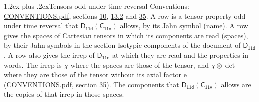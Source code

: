 \documentclass[10pt,a4paper]{article}
\makeatletter
\renewcommand\section{\@startsection{section}{1}{\z@}{-3ex plus -1ex minus -.2ex}%
  {1.2ex plus .2ex}{\normalfont\large\sffamily\bfseries\color{parttitle}}}
\numberwithin{equation}{section}
\newcommand{\grp}[1]{\mathsf{#1}}
\newcommand{\irrprod}{\otimes}
\makeatother
\begin{document}
\section{Tensors odd under time reversal}\label{s:time_odd}
Conventions: \href{../../CONVENTIONS.pdf}{CONVENTIONS.pdf}, sections \href{../../../rotation/CONVENTIONS.pdf\#conv.10}{10}, \href{../../../rotation/CONVENTIONS.pdf\#conv.13.2}{13.2} and \href{../../CONVENTIONS.pdf\#conv.35}{35}.
\leavevmode\label{n:head.name.property}A row is a tensor property odd under time reversal that $\grp{D_{11d}}(\grp{C_{11v}})$ allows, by its Jahn symbol (name). \label{n:head.spaces}A row gives the spaces of Cartesian tensors in which its components are read (spaces), by their Jahn symbols in the section Isotypic components of the document of \href{../../../rotation/data/pdf/D11d.pdf}{$\grp{D_{11d}}$}. \label{n:head.properties}A row also gives the irrep of $\grp{D_{11d}}$ at which they are read and the properties in words. The irrep is $\chi$ where the spaces are those of the tensor, and $\chi \irrprod \det$ where they are those of the tensor without its axial factor e (\href{../../CONVENTIONS.pdf}{CONVENTIONS.pdf}, section \href{../../CONVENTIONS.pdf\#conv.35}{35}). The components that $\grp{D_{11d}}(\grp{C_{11v}})$ allows are the copies of that irrep in those spaces.
\end{document}
